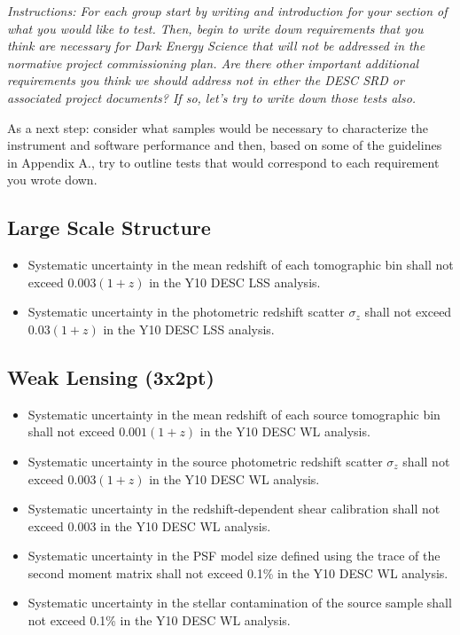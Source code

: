 \documentclass[modern]{desc-tex/styles/lsstdescnote}
\begin{document}
{\it Instructions: For each group start by writing and introduction for your section of what you would like to test.  Then, begin to write down requirements that you think are necessary for Dark Energy Science that will not be addressed in the normative project commissioning plan.  Are there other important additional requirements you think we should address not in ether the DESC SRD or associated project documents?  If so, let's try to write down those tests also.

As a next step: consider what samples would be necessary to characterize the instrument and software performance and then, based on some of the guidelines in Appendix A., try to outline tests that would correspond to each requirement you wrote down. }

\subsection{Large Scale Structure}

\begin{itemize}
\item Systematic uncertainty in the mean redshift of each tomographic bin shall not exceed $0.003 (1 + z)$ in the Y10 DESC LSS analysis.
\item Systematic uncertainty in the photometric redshift scatter $\sigma_z$ shall not exceed $0.03 (1 + z)$ in the Y10 DESC LSS analysis.
\end{itemize}

\subsection{Weak Lensing (3x2pt)}

\begin{itemize}
\item Systematic uncertainty in the mean redshift of each source tomographic bin shall not exceed $0.001 (1 + z)$ in the Y10 DESC WL analysis.
\item Systematic uncertainty in the source photometric redshift scatter $\sigma_z$  shall not exceed $0.003 (1 + z) $ in the Y10 DESC WL analysis.
\item Systematic uncertainty in the redshift-dependent shear calibration shall not exceed 0.003 in the Y10 DESC WL analysis.
\item Systematic uncertainty in the PSF model size defined using the trace of the second moment matrix shall not exceed 0.1\% in the Y10 DESC WL analysis.
\item Systematic uncertainty in the stellar contamination of the source sample shall not exceed 0.1\% in the Y10 DESC WL analysis.
\end{itemize}
\end{document}
